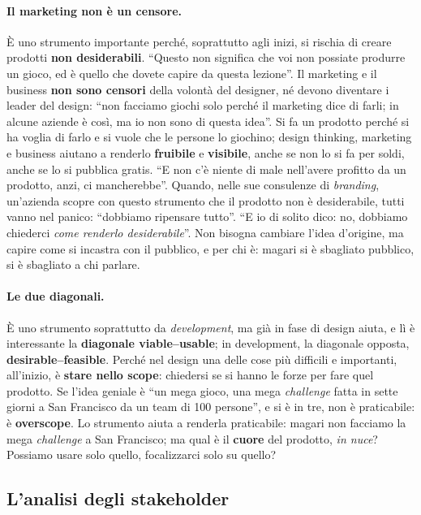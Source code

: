 \paragraph{Il marketing non è un censore.} È uno strumento importante perché, soprattutto
agli inizi, si rischia di creare prodotti \textbf{non desiderabili}. ``Questo non
significa che voi non possiate produrre un gioco, ed è quello che dovete capire da questa
lezione''. Il marketing e il business \textbf{non sono censori} della volontà del
designer, né devono diventare i leader del design: ``non facciamo giochi solo perché il
marketing dice di farli; in alcune aziende è così, ma io non sono di questa idea''. Si fa
un prodotto perché si ha voglia di farlo e si vuole che le persone lo giochino; design
thinking, marketing e business aiutano a renderlo \textbf{fruibile} e \textbf{visibile},
anche se non lo si fa per soldi, anche se lo si pubblica gratis. ``E non c'è niente di
male nell'avere profitto da un prodotto, anzi, ci mancherebbe''. Quando, nelle sue
consulenze di \emph{branding}, un'azienda scopre con questo strumento che il prodotto non
è desiderabile, tutti vanno nel panico: ``dobbiamo ripensare tutto''. ``E io di solito
dico: no, dobbiamo chiederci \emph{come renderlo desiderabile}''. Non bisogna cambiare
l'idea d'origine, ma capire come si incastra con il pubblico, e per chi è: magari si è
sbagliato pubblico, si è sbagliato a chi parlare.

\paragraph{Le due diagonali.} È uno strumento soprattutto da \emph{development}, ma già in
fase di design aiuta, e lì è interessante la \textbf{diagonale viable--usable}; in
development, la diagonale opposta, \textbf{desirable--feasible}. Perché nel design una
delle cose più difficili e importanti, all'inizio, è \textbf{stare nello scope}:
chiedersi se si hanno le forze per fare quel prodotto. Se l'idea geniale è ``un mega
gioco, una mega \emph{challenge} fatta in sette giorni a San Francisco da un team di 100
persone'', e si è in tre, non è praticabile: è \textbf{overscope}. Lo strumento aiuta a
renderla praticabile: magari non facciamo la mega \emph{challenge} a San Francisco; ma
qual è il \textbf{cuore} del prodotto, \emph{in nuce}? Possiamo usare solo quello,
focalizzarci solo su quello?

\subsection{L'analisi degli stakeholder}

